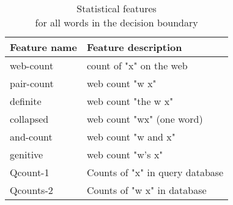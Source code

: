 \begin{table}[t]
 \caption{Statistical features\\for all words in the decision boundary}
 \label{table-statistical-features-bergsma-2007}
 \centering
 \small
 \begin{tabular}{@{}ll@{}}
  \toprule
  Feature name & Feature description\\
  \midrule
  web-count & count of "x" on the web\\
  pair-count & web count "w x"\\
  definite & web count "the w x"\\
  collapsed & web count "wx" (one word)\\
  and-count & web count "w and x"\\
  genitive & web count "w's x"\\
  Qcount-1 & Counts of "x" in query database\\
  Qcounts-2 & Counts of "w x" in database\\
  \bottomrule
 \end{tabular}
\end{table}
